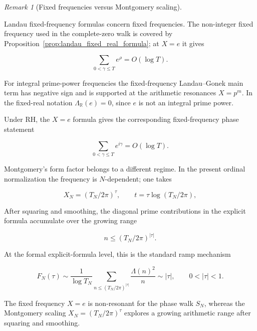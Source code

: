 \documentclass[11pt]{amsart}
\numberwithin{equation}{section}
\theoremstyle{plain}
\theoremstyle{definition}
\theoremstyle{remark}
\newtheorem{remark}[theorem]{Remark}
\begin{document}
\begin{remark}[Fixed frequencies versus Montgomery scaling]
\label{rem:fixed_landau_frequencies_vs_montgomery_scaling}

Landau fixed-frequency formulas concern fixed frequencies. The
non-integer fixed frequency used in the complete-zero walk is covered by
Proposition~\ref{prop:landau_fixed_real_formula}; at \(X=e\) it gives

\begin{equation}
\sum_{0<\gamma\le T}e^{\rho}
=
O(\log T).
\label{eq:fixed_frequency_landau_in_montgomery_remark}
\end{equation}

For integral prime-power frequencies the fixed-frequency Landau--Gonek
main term has negative sign and is supported at the arithmetic
resonances \(X=p^m\). In the fixed-real notation
\(\Lambda_{\mathbb R}(e)=0\), since \(e\) is not an integral prime power.

Under RH, the \(X=e\) formula gives the corresponding fixed-frequency phase
statement

\begin{equation}
\sum_{0<\gamma\le T}e^{i\gamma}
=
O(\log T).
\label{eq:fixed_frequency_phase_form_montgomery_remark}
\end{equation}

Montgomery's form factor belongs to a different regime. In the present
ordinal normalization the frequency is \(N\)-dependent; one takes

\begin{equation}
X_N=(T_N/2\pi)^\tau,
\qquad
t=\tau\log(T_N/2\pi),
\label{eq:moving_montgomery_frequency}
\end{equation}

After squaring and smoothing, the diagonal prime contributions in the
explicit formula accumulate over the growing range

\begin{equation}
n\le (T_N/2\pi)^{|\tau|}.
\label{eq:moving_montgomery_prime_range}
\end{equation}

At the formal explicit-formula level, this is the standard ramp mechanism

\begin{equation}
F_N(\tau)
\sim
\frac1{\log T_N}
\sum_{n\le (T_N/2\pi)^{|\tau|}}
\frac{\Lambda(n)^2}{n}
\sim
|\tau|,
\qquad
0<|\tau|<1.
\label{eq:fixed_vs_moving_ramp_mechanism}
\end{equation}

The fixed frequency \(X=e\) is non-resonant for the phase walk \(S_N\),
whereas the Montgomery scaling \(X_N=(T_N/2\pi)^\tau\) explores a growing
arithmetic range after squaring and smoothing.

\end{remark}
\end{document}

